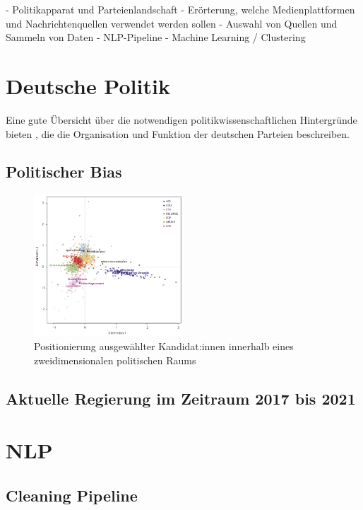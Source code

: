 -   Politikapparat und Parteienlandschaft
-   Erörterung, welche Medienplattformen und Nachrichtenquellen verwendet werden sollen
-   Auswahl von Quellen und Sammeln von Daten
-   NLP-Pipeline
-   Machine Learning / Clustering

\section{Deutsche Politik}
Eine gute Übersicht über die notwendigen politikwissenschaftlichen Hintergründe bieten \textcite{bukow_innerparteiliche_2013}, die die Organisation und Funktion der deutschen Parteien beschreiben.

\subsection{Politischer Bias}

\begin{figure}[H]
    \centering
    \includegraphics[width=0.5\textwidth]{images/positionierung_ausgewaehlter_kandidaten.png}
    \caption[Positionierung ausgewählter Kandidat:innen]{Positionierung ausgewählter Kandidat:innen innerhalb eines zweidimensionalen politischen Raums \autocite{saltzer_bundestagswahl_2022}} \label{fig:positionierungAusgewaehlterKanidaten}
\end{figure}

\subsection{Aktuelle Regierung im Zeitraum 2017 bis 2021}

\section{NLP}

\subsection{Cleaning Pipeline}

